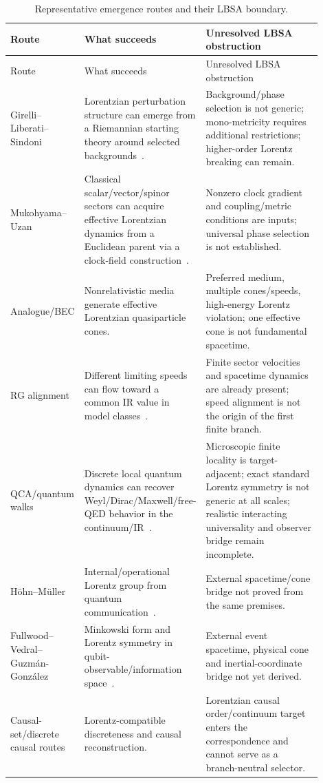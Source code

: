\documentclass[11pt,a4paper]{article}
\begin{document}
\begin{longtable}{>{\raggedright\arraybackslash}p{0.20\linewidth}>{\raggedright\arraybackslash}p{0.31\linewidth}>{\raggedright\arraybackslash}p{0.39\linewidth}}
\caption{Representative emergence routes and their LBSA boundary.}\\
\toprule
Route & What succeeds & Unresolved LBSA obstruction \\
\midrule
\endfirsthead
\toprule
Route & What succeeds & Unresolved LBSA obstruction \\
\midrule
\endhead
Girelli--Liberati--Sindoni & Lorentzian perturbation structure can emerge from a Riemannian starting theory around selected backgrounds~\cite{girelli2009}. & Background/phase selection is not generic; mono-metricity requires additional restrictions; higher-order Lorentz breaking can remain. \\
Mukohyama--Uzan & Classical scalar/vector/spinor sectors can acquire effective Lorentzian dynamics from a Euclidean parent via a clock-field construction~\cite{mukohyama2013}. & Nonzero clock gradient and coupling/metric conditions are inputs; universal phase selection is not established. \\
Analogue/BEC & Nonrelativistic media generate effective Lorentzian quasiparticle cones. & Preferred medium, multiple cones/speeds, high-energy Lorentz violation; one effective cone is not fundamental spacetime. \\
RG alignment & Different limiting speeds can flow toward a common IR value in model classes~\cite{anber2011}. & Finite sector velocities and spacetime dynamics are already present; speed alignment is not the origin of the first finite branch. \\
QCA/quantum walks & Discrete local quantum dynamics can recover Weyl/Dirac/Maxwell/free-QED behavior in the continuum/IR~\cite{darianoperinotti2014,brun2025}. & Microscopic finite locality is target-adjacent; exact standard Lorentz symmetry is not generic at all scales; realistic interacting universality and observer bridge remain incomplete. \\
H\"ohn--M\"uller & Internal/operational Lorentz group from quantum communication~\cite{hohn2016}. & External spacetime/cone bridge not proved from the same premises. \\
Fullwood--Vedral--Guzm\'an-Gonz\'alez & Minkowski form and Lorentz symmetry in qubit-observable/information space~\cite{fullwood2026}. & External event spacetime, physical cone and inertial-coordinate bridge not yet derived. \\
Causal-set/discrete causal routes & Lorentz-compatible discreteness and causal reconstruction. & Lorentzian causal order/continuum target enters the correspondence and cannot serve as a branch-neutral selector. \\
\bottomrule
\end{longtable}
\end{document}
